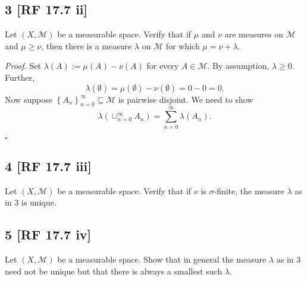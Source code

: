 \documentclass[12pt]{article}
\newcounter{ProofCounter}
\newenvironment{Proof}{\stepcounter{ProofCounter}\textit{Proof.}}{\hfill$\square$}
\begin{document}
\newpage 
\subsection*{3 [RF 17.7 ii]}
\begin{tcolorbox}
Let $(X,\mathcal{M})$ be a measurable space. Verify that if $\mu$ and $\nu$ are measures on $\mathcal{M}$ and $\mu \geq \nu$, then there is a measure
$\lambda$ on $\mathcal{M}$ for which $\mu = \nu + \lambda$.
\end{tcolorbox}
\begin{Proof}
Set $\lambda(A) := \mu(A) - \nu(A)$ for every $A \in \mathcal{M}$. By assumption, $\lambda \geq 0$. Further,
\begin{equation*}
\lambda(\emptyset) = \mu(\emptyset) - \nu(\emptyset) = 0 - 0 = 0.
\end{equation*}
Now suppose $\left\{ A_{n} \right\}_{n=0}^{\infty} \subseteq \mathcal{M}$ is pairwise disjoint. We need to show 
\begin{equation}
\lambda\left( \cup_{n=0}^{\infty}A_{n} \right) = \sum_{n=0}^{\infty}\lambda(A_{n}).
\label{3.2}
\end{equation}

\end{Proof}

\newpage 
\subsection*{4 [RF 17.7 iii]}
\begin{tcolorbox}
Let $(X,\mathcal{M})$ be a measurable space. Verify that if $\nu$ is $\sigma$-finite, the measure $\lambda$ as in 3 is unique.
\end{tcolorbox}

\newpage 
\subsection*{5 [RF 17.7 iv]}
\begin{tcolorbox}
Let $(X,\mathcal{M})$ be a measurable space. Show that in general the measure $\lambda$ as in 3 need not be unique but that there is always a smallest
such $\lambda$.
\end{tcolorbox}
\end{document}
